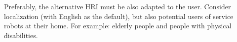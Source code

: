 Preferably, the alternative HRI must be also adapted to the user.
Consider localization (with English as the default), but also potential users of service robots at their home.
For example: elderly people and people with physical disabilities.


